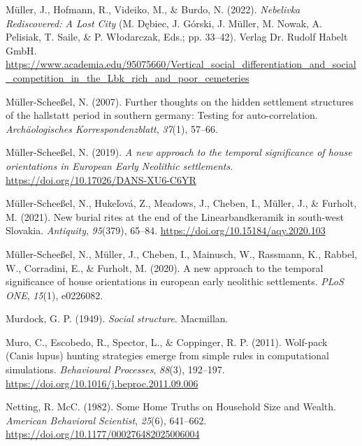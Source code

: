 \documentclass[
  12pt,
]{book}
\newlength{\cslhangindent}
\newlength{\cslentryspacingunit} %
\newenvironment{CSLReferences}[2] %
 {%
  \setlength{\parindent}{0pt}
  \ifodd #1
  \let\oldpar\par
  \def\par{\hangindent=\cslhangindent\oldpar}
  \fi
  \setlength{\parskip}{#2\cslentryspacingunit}
 }%
 {}
\begin{document}
\begin{CSLReferences}{1}{0}
\leavevmode{}%
Müller, J., Hofmann, R., Videiko, M., \& Burdo, N. (2022). \emph{Nebelivka {\textendash} Rediscovered: A Lost City} (M. Dębiec, J. Górski, J. Müller, M. Nowak, A. Pelisiak, T. Saile, \& P. Włodarczak, Eds.; pp. 33--42). Verlag Dr. Rudolf Habelt GmbH. \url{https://www.academia.edu/95075660/Vertical_social_differentiation_and_social_competition_in_the_Lbk_rich_and_poor_cemeteries}

\leavevmode{}%
Müller-Scheeßel, N. (2007). Further thoughts on the hidden settlement structures of the hallstatt period in southern germany: Testing for auto-correlation. \emph{Archäologisches Korrespondenzblatt}, \emph{37}(1), 57--66.

\leavevmode{}%
Müller-Scheeßel, N. (2019). \emph{A new approach to the temporal significance of house orientations in European Early Neolithic settlements}. \url{https://doi.org/10.17026/DANS-XU6-C6YR}

\leavevmode{}%
Müller-Scheeßel, N., Hukeľová, Z., Meadows, J., Cheben, I., Müller, J., \& Furholt, M. (2021). New burial rites at the end of the {Linearbandkeramik} in south-west {Slovakia}. \emph{Antiquity}, \emph{95}(379), 65--84. \url{https://doi.org/10.15184/aqy.2020.103}

\leavevmode{}%
Müller-Scheeßel, N., Müller, J., Cheben, I., Mainusch, W., Rassmann, K., Rabbel, W., Corradini, E., \& Furholt, M. (2020). A new approach to the temporal significance of house orientations in european early neolithic settlements. \emph{PLoS ONE}, \emph{15}(1), e0226082.

\leavevmode{}%
Murdock, G. P. (1949). \emph{Social structure}. Macmillan.

\leavevmode{}%
Muro, C., Escobedo, R., Spector, L., \& Coppinger, R. P. (2011). Wolf-pack (Canis lupus) hunting strategies emerge from simple rules in computational simulations. \emph{Behavioural Processes}, \emph{88}(3), 192--197. \url{https://doi.org/10.1016/j.beproc.2011.09.006}

\leavevmode{}%
Netting, R. McC. (1982). Some Home Truths on Household Size and Wealth. \emph{American Behavioral Scientist}, \emph{25}(6), 641--662. \url{https://doi.org/10.1177/000276482025006004}


\end{CSLReferences}
\end{document}
